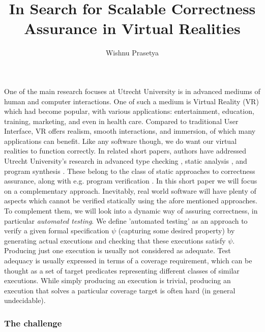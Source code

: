 \documentclass[sigplan]{acmart}\settopmatter{printfolios=false,printccs=false,printacmref=false}
\begin{document}
\title[Short Title]{In Search for Scalable Correctness Assurance in Virtual Realities}  
\author{Wishnu Prasetya}

\maketitle

One of the main research focuses at Utrecht University is in advanced mediums of human and computer
interactions. One of such a medium is Virtual Reality (VR) which had become popular, with various applications: entertainment, education,
training, marketing, and even in health care. 
%
%
Compared to traditional User Interface, VR offers realism, smooth interactions, and immersion, of which
many applications can benefit. Like any software though, we do want our virtual realities to
function correctly. In related short papers, authors have addressed Utrecht University's research in
%
advanced type checking \cite{wouterLorenz2018},
static analysis \cite{xxx},
and program synthesis \cite{xxx}.
These belong to the class of static approaches to correctness assurance, along with
e.g. program verification \cite{cok2004esc}.
%
In this short paper we will focus on a complementary approach. 
Inevitably, real world software will have
plenty of aspects which cannot be verified statically using the afore mentioned approaches.
To complement them, we will look into a dynamic way of assuring correctness, in particular
{\em automated testing}. We define 'automated testing' as an
approach to verify a given formal specification $\psi$ (capturing some desired property) 
by generating actual executions and checking
that these executions satisfy $\psi$. Producing just one execution is usually not considered
as adequate. Test adequacy is usually expressed in terms of a coverage requirement, which can
be thought as a set of target predicates representing different classes of similar executions.
While simply producing an execution is trivial, producing an execution that solves a particular
coverage target is often hard (in general undecidable).


\subsubsection*{The challenge}
\end{document}
